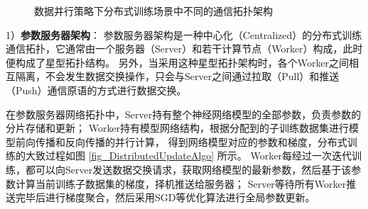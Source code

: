 \documentclass{xdupgthesis}
\begin{document}
\begin{figure}[ht]
    \centering
    \caption{数据并行策略下分布式训练场景中不同的通信拓扑架构 \cite{tang2020communication}}
    \label{fig_DistributedStruct}
\end{figure}

1）\textbf{参数服务器架构}：
参数服务器架构\cite{li2014scaling}是一种中心化（Centralized）的分布式训练通信拓扑，它通常由一个服务器（Server）和若干计算节点（Worker）构成，此时便构成了星型拓扑结构。
另外，当采用这种星型拓扑架构时，各个Worker之间相互隔离，不会发生数据交换操作，只会与Server之间通过拉取（Pull）和推送（Push）通信原语的方式进行数据交换。

在参数服务器网络拓扑中，Server持有整个神经网络模型的全部参数，负责参数的分片存储和更新；
Worker持有模型网络结构，根据分配到的子训练数据集进行模型前向传播和反向传播的并行计算，
得到网络模型对应的参数和梯度，分布式训练的大致过程如图 \ref{fig_DistributedUpdateAlgo}  所示。
Worker每经过一次迭代训练，都可以向Server发送数据交换请求，获取网络模型的最新参数，然后基于该参数计算当前训练子数据集的梯度，择机推送给服务器；
Server等待所有Worker推送完毕后进行梯度聚合，然后采用SGD等优化算法进行全局参数更新。
\end{document}
